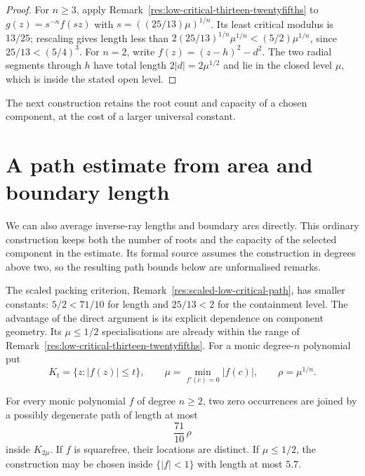 \begin{proof}
For $n\ge3$, apply Remark~\ref{res:low-critical-thirteen-twentyfifths}
to $g(z)=s^{-n}f(sz)$ with $s=((25/13)\mu)^{1/n}$.
Its least critical modulus is $13/25$; rescaling gives length less than
$2(25/13)^{1/n}\mu^{1/n}<(5/2)\mu^{1/n}$, since
$25/13<(5/4)^3$.  For $n=2$, write $f(z)=(z-h)^2-d^2$.
The two radial segments through $h$ have total length $2|d|=2\mu^{1/2}$
and lie in the closed level $\mu$, which is inside the stated open level.
\end{proof}
The next construction retains the root count and capacity of a chosen
component, at the cost of a larger universal constant.

\section{A path estimate from area and boundary length}
\label{sec:constant-factor}

We can also average inverse-ray lengths and boundary arcs directly.
This ordinary construction keeps both the number of roots and the
capacity of the selected component in the estimate. Its formal source
assumes the construction in degrees above two, so the resulting path
bounds below are unformalised remarks.

The scaled packing criterion, Remark~\ref{res:scaled-low-critical-path},
has smaller constants: $5/2<71/10$ for length and $25/13<2$ for the
containment level. The advantage of the direct argument is its explicit
dependence on component geometry. Its $\mu\le1/2$ specialisations are
already within the range of Remark~\ref{res:low-critical-thirteen-twentyfifths}.
For a monic degree-$n$ polynomial put
\[
 K_t=\{z:|f(z)|\le t\},\qquad
 \mu=\min_{f'(c)=0}|f(c)|,\qquad \rho=\mu^{1/n}.
\]

\begin{remark}
\label{res:constant-factor-path}
For every monic polynomial $f$ of degree $n\ge2$, two zero occurrences are
joined by a possibly degenerate path of length at most
\[
 \frac{71}{10}\,\rho
\]
inside $K_{2\mu}$.  If $f$ is squarefree, their locations are distinct.
If $\mu\le1/2$, the construction may be chosen inside $\{|f|<1\}$ with
length at most $5.7$.
\end{remark}


